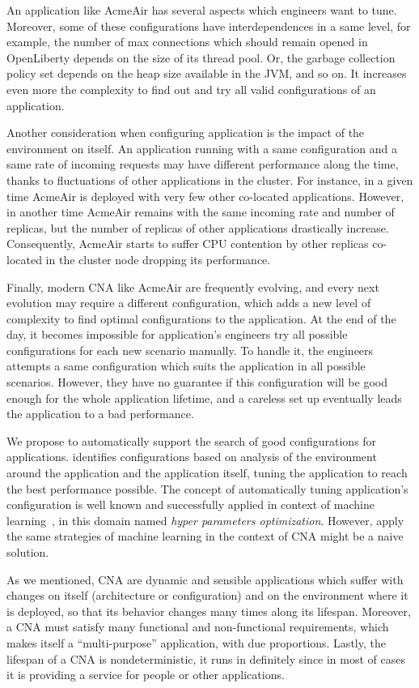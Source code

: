 An application like AcmeAir has several aspects which engineers want to tune.
Moreover, some of these configurations have interdependences in a same level,
for example, the number of max connections which should remain opened in
OpenLiberty depends on the size of its thread pool. Or, the garbage collection
policy set depends on the heap size available in the JVM, and so on. It
increases even more the complexity to find out and try all valid configurations
of an application.

Another consideration when configuring application is the impact of the
environment on itself. An application running with a same configuration and a
same rate of incoming requests may have different performance along the time,
thanks to fluctuations of other applications in the cluster. For instance, in a
given time AcmeAir is deployed with very few other co-located applications.
However, in another time AcmeAir remains with the same incoming rate and number
of replicas, but the number of replicas of other applications drastically
increase. Consequently, AcmeAir starts to suffer CPU contention by other
replicas co-located in the cluster node dropping its performance.

Finally, modern CNA like AcmeAir are frequently evolving, and every next
evolution may require a different configuration, which adds a new level of
complexity to find optimal configurations to the application. At the end of the
day, it becomes impossible for application's engineers try all possible
configurations for each new scenario manually. To handle it, the engineers
attempts a same configuration which suits the application in all possible
scenarios.  However, they have no guarantee if this configuration will be good
enough for the whole application lifetime, and a careless set up eventually
leads the application to a bad performance.

We propose \name to automatically support the search of good configurations for
applications. \name identifies configurations based on analysis of the
environment around the application and the application itself, tuning the
application to reach the best performance possible. The concept of automatically
tuning application's configuration is well known and successfully applied in
context of machine learning~\cite{}, in this domain named \emph{hyper parameters
optimization}. However, apply the same strategies of machine learning in the
context of CNA might be a naive solution.

As we mentioned, CNA are dynamic and sensible applications which suffer with
changes on itself (architecture or configuration) and on the environment where
it is deployed, so that its behavior changes many times along its lifespan.
Moreover, a CNA must satisfy many functional and non-functional requirements,
which makes itself a ``multi-purpose'' application, with due proportions.
Lastly, the lifespan of a CNA is nondeterministic, it runs in definitely since
in most of cases it is providing a service for people or other applications.

